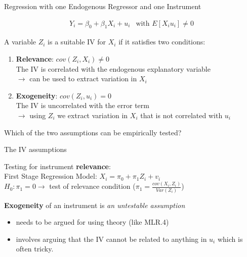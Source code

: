 \documentclass[11pt, aspectratio = 169]{beamer}
\begin{document}
\begin{frame}{Regression with one Endogenous Regressor and one Instrument}

\begin{align*}
    Y_i = \beta_0 + \beta_1 X_i + u_i \: \: \text{ with } E[X_iu_i] \neq 0
\end{align*}

A variable $Z_i$ is a \alert{suitable IV} for $X_i$ if it satisfies two conditions:

\pause
\begin{enumerate}
    \item \alert{\textbf{Relevance}}: $cov(Z_i, X_i ) \neq 0$ \\
    The IV is correlated with the endogenous explanatory variable \\
    $\rightarrow$ can be used to extract variation in $X_i$
\item \alert{\textbf{Exogeneity}}:  $cov(Z_i, u_i ) = 0$ \\
The IV is uncorrelated with the error term \\
    $\rightarrow$ using $Z_i$ we extract variation in $X_i$ that is not correlated with $u_i$

\end{enumerate}
\pause
Which of the two assumptions can be empirically tested?
\end{frame}



\begin{frame}{The IV assumptions}
    
Testing for instrument \textbf{relevance}: \\
\vspace{+0.2cm}
First Stage Regression Model: \hspace{+0.2cm} $X_i = \pi_0 + \pi_1 Z_i + v_i$ \\
\vspace{+0.2cm}
$H_0: \pi_1 = 0  \rightarrow$ test of relevance condition ($\pi_1 = \frac{cov(X_i, Z_i)}{Var(Z_i)}$)

\bigskip

\pause
\textbf{Exogeneity} of an instrument  is \textit{an untestable assumption} \\
\begin{itemize}
    \item needs to be argued for using theory (like MLR.4)
    \item involves arguing that the IV cannot be related to anything in $u_i$ which is often tricky.
\end{itemize}
\end{frame}
\end{document}
